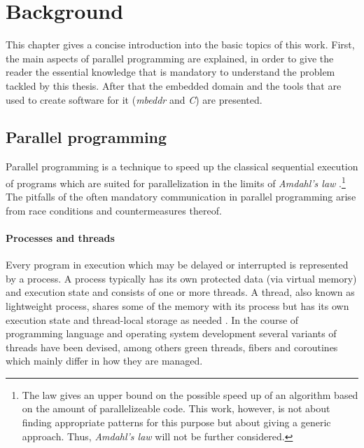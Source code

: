 \chapter{Background}
This chapter gives a concise introduction into the basic topics of this work. First, the main aspects of parallel programming are explained, in order to give the reader the essential knowledge that is mandatory to understand the problem tackled by this thesis. After that the embedded domain and the tools that are used to create software for it (\textit{mbeddr} and \textit{C}) are presented.

\section{Parallel programming}
Parallel programming is a technique to speed up the classical sequential execution of programs which are suited for parallelization in the limits of \textit{Amdahl's law} \cite[p.~61]{IntroductionToParallelProgramming}.\footnote{The law gives an upper bound on the possible speed up of an algorithm based on the amount of parallelizeable code. This work, however, is not about finding appropriate patterns for this purpose but about giving a generic approach. Thus, \textit{Amdahl's law} will not be further considered.} The pitfalls of the often mandatory communication in parallel programming arise from race conditions and countermeasures thereof.

\subsubsection{Processes and threads}
Every program in execution which may be delayed or interrupted is represented by a process. A process typically has its own protected data (via virtual memory) and execution state and consists of one or more threads. A thread, also known as lightweight process, shares some of the memory with its process but has its own execution state and thread-local storage as needed \cite[p.~20]{PrinciplesOfModernOSs}. In the course of programming language and operating system development several variants of threads have been devised, among others green threads, fibers and coroutines which mainly differ in how they are managed.

